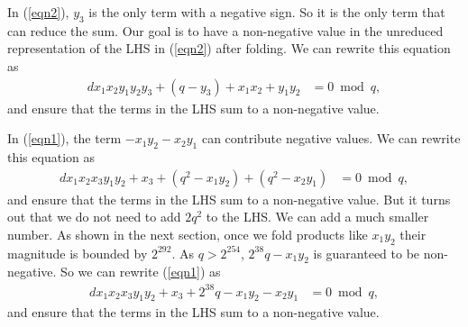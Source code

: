 \documentclass[a4paper, 12pt]{article}
\begin{document}
In (\ref{eqn2}), $y_3$ is the only term with a negative sign. So it is the only term that can reduce the sum. Our goal is to have a non-negative value in the unreduced representation of the LHS in (\ref{eqn2}) after folding. We can rewrite this equation as
\begin{align}
  dx_1x_2y_1y_2y_3 + (q - y_3) + x_1x_2 + y_1y_2 &= 0 \bmod q,\label{eqn3}
\end{align}
and ensure that the terms in the LHS sum to a non-negative value.

In (\ref{eqn1}), the term $-x_1y_2-x_2y_1$ can contribute negative values. We can rewrite this equation as
\begin{align}
  dx_1x_2x_3y_1y_2 + x_3 +(q^2 - x_1y_2) + (q^2 - x_2y_1) &= 0 \bmod q,\label{eqn4}
\end{align}
and ensure that the terms in the LHS sum to a non-negative value. But it turns out that we do not need to add $2q^2$ to the LHS. We can add a much smaller number. As shown in the next section, once we fold products like $x_1y_2$ their magnitude is bounded by $2^{292}$. As $q > 2^{254}$, $2^{38}q - x_1y_2$ is guaranteed to be non-negative. So we can rewrite (\ref{eqn1}) as 
\begin{align}
  dx_1x_2x_3y_1y_2 + x_3 + 2^{38}q - x_1y_2 - x_2y_1  &= 0 \bmod q,\label{eqn5}
\end{align}
and ensure that the terms in the LHS sum to a non-negative value.
\end{document}
